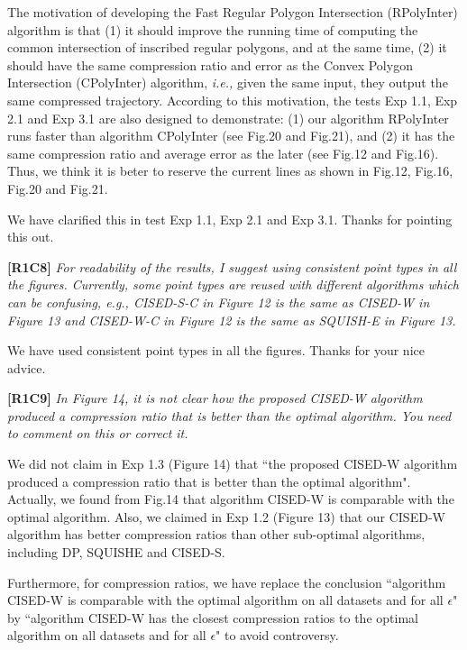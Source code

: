 \documentclass{letter}
\newcommand{\ie}{\emph{i.e.,}\xspace}
\begin{document}
{The motivation of developing the Fast Regular Polygon Intersection (RPolyInter) algorithm is that (1) it should improve the running time of computing the common intersection of inscribed regular polygons, and at the same time, (2) it should have the same compression ratio and error as the Convex Polygon Intersection (CPolyInter) algorithm, \ie  given the same input, they output the same compressed trajectory.
%
According to this motivation, the tests Exp 1.1, Exp 2.1 and Exp 3.1 are also designed to demonstrate: (1) our algorithm RPolyInter runs faster than algorithm CPolyInter (see Fig.20 and Fig.21), and (2) it has the same compression ratio and average error as the later (see Fig.12 and Fig.16).
%
Thus, we think it is beter to reserve the current lines as shown in Fig.12, Fig.16, Fig.20 and Fig.21. %

We have clarified this in test Exp 1.1, Exp 2.1 and Exp 3.1. Thanks for pointing this out.

\textbf{[R1C8]} \emph{For readability of the results, I suggest using consistent point types in all the figures. Currently, some point types are reused with different algorithms which can be confusing, e.g., CISED-S-C in Figure 12 is the same as CISED-W in Figure 13 and CISED-W-C in Figure 12 is the same as SQUISH-E in Figure 13.}

We have used consistent point types in all the figures. Thanks for your nice advice.

\textbf{[R1C9]} \emph{In Figure 14, it is not clear how the proposed CISED-W algorithm produced a compression ratio that is better than the optimal algorithm. You need to comment on this or correct it.}

We did not claim in Exp 1.3 (Figure 14) that ``the proposed CISED-W algorithm produced a compression ratio that is better than the optimal algorithm".
Actually, we found from Fig.14 that algorithm CISED-W is comparable with the optimal algorithm.
Also, we claimed in Exp 1.2 (Figure 13) that our CISED-W algorithm has better compression ratios than other sub-optimal algorithms, including DP, SQUISHE and CISED-S.

Furthermore, for compression ratios, we have replace the conclusion ``algorithm CISED-W is comparable with the optimal algorithm on all datasets and for all $\epsilon$" by ``algorithm CISED-W has the closest compression ratios to the optimal algorithm on all datasets and for all $\epsilon$" to avoid controversy.

}
\end{document}

